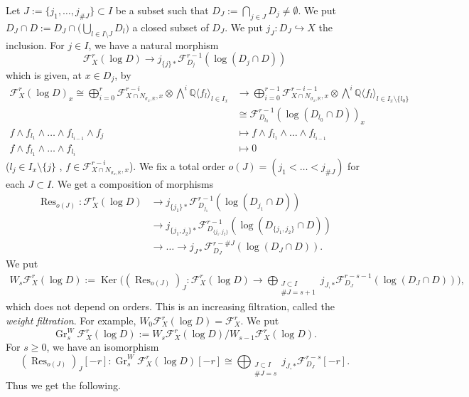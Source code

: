 \documentclass[12pt,a4]{amsart}
\def\R{\mathbb{R}}
\def\Q{\mathbb{Q}}
\def\F{\mathscr{F}}
\def\Res{\mathop{\mathrm{Res}}\nolimits}
\def\Gr{\mathop{\mathrm{Gr}}\nolimits}
\def\Ker{\mathop{\mathrm{Ker}}\nolimits}
\def\Gr{\mathop{\mathrm{Gr}}\nolimits}
\numberwithin{equation}{section}
\numberwithin{figure}{section}
\begin{document}
  
  Let $J:= \{j_1,\dots,j_{\# J}\} \subset I$ be a subset such that $D_J := \bigcap_{j\in J} D_j \neq \emptyset$.
  We put $D_J \cap D := D_J \cap \big(\bigcup_{l \in I \setminus J} D_l \big)$ a closed subset of $D_J$.
  We put $j_J \colon D_J \hookrightarrow X$ the inclusion.
  For $ j \in I$, we have a natural morphism
  $$\F^r_X (\log D) \to j_{\{j\}*} \F^{r-1}_{D_{j}} (\log (D_{j} \cap  D ) )   $$
  which is given, at $x \in D_{j}$, by 
  \begin{align*}
  \F^r_X (\log D)_x 
  \cong \bigoplus_{ i=0}^r 
  \F^{r-i}_{X \cap N_{\sigma_x,\R},x}  
   \otimes  
  \bigwedge^i \Q \langle f_l \rangle_{l \in I_x}  
  & 
  \to 
  \bigoplus_{ i=0}^{r-1} 
  \F^{r-i-1}_{X \cap N_{\sigma_x,\R},x}  
    \otimes  
  \bigwedge^i \Q \langle f_l \rangle_{l \in I_x \setminus \{ l_0 \}}  
  \\
  & \cong \F^{r-1}_{D_{l_0}} (\log (D_{l_0} \cap  D ) )_x  
  \\
  f \wedge f_{l_1}\wedge \dots \wedge f_{l_{i-1}} \wedge f_{j}  
  & \mapsto
   f \wedge f_{l_1}\wedge \dots \wedge f_{l_{i-1}} 
    \\
   f \wedge f_{l_1}\wedge \dots \wedge f_{l_i}   & \mapsto 0
  \end{align*}
  ($l_j \in I_x \setminus \{j \}$ , $f \in \F^{r-i}_{X \cap N_{\sigma_x,\R},x}$).
  We fix a total order $o(J)= (j_1 < \dots < j_{\# J})$ 
   for each $J \subset I$.
  We get a composition of morphisms 
  \begin{align*}
  \Res_{o(J)} \colon 
    \F^r_X (\log D)&  \to j_{\{j_1\}*} \F^{r-1}_{D_{j_1}} (\log (D_{j_1} \cap D ) )  
    \\
  & \to 
  j_{\{j_1,j_2\}*} \F^{r-1}_{D_{\{j_1,j_2\}}} (\log (D_{\{j_1,j_2\}} \cap D ) )
  \\ 
  & \to \dots \to 
  j_{J*} \F^{r-\# J}_{D_J} (\log (D_J \cap D ) ).
  \end{align*}
  We put 
  \begin{align*}
   W_s \F^r_X (\log D) 
  :=  \Ker \bigg( 
  (\Res_{o(J)})_J
   \colon 
  \F^r_X (\log D)  
  \to 
  \bigoplus_{\substack{J \subset I \\ \# J= s+1}}
  j_{J,*} \F^{r-s-1}_{D_J} (\log (D_J \cap D ) )
  \bigg),
  \end{align*}
  which does not depend on orders.
  This is an increasing filtration, called the \emph{weight filtration}.
  For example, 
  $W_0 \F^r_X (\log D) = 
   \F^r_X  $.
  We put 
  $$ 
   \Gr^W_s \F^r_X (\log D) 
  := W_s \F^r_X (\log D)  / W_{s-1} \F^r_X (\log D) .$$
    For $s \geq 0$, 
    we have an isomorphism
   $$
  (\Res_{o(J)})_J [-r]
   \colon 
   \Gr^W_s \F^r_X (\log D) [-r]
  \cong \bigoplus_{\substack{J \subset I \\ \# J= s}}
  j_{J ,* } \F_{D_J  }^{r-s} [-r].$$
   Thus we get the following.
\end{document}
